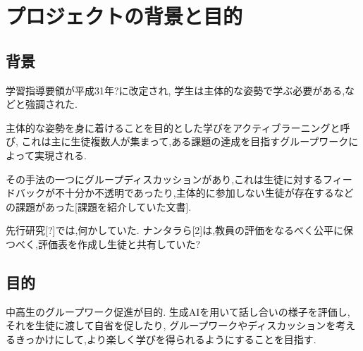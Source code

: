 \chapter{プロジェクトの背景と目的}

\section{背景}
学習指導要領が平成31年?に改定され,
学生は主体的な姿勢で学ぶ必要がある,などと強調された.

主体的な姿勢を身に着けることを目的とした学びをアクティブラーニングと呼び,
これは主に生徒複数人が集まって,ある課題の達成を目指すグループワークによって実現される.

その手法の一つにグループディスカッションがあり,これは生徒に対するフィードバックが不十分か不透明であったり,主体的に参加しない生徒が存在するなどの課題があった[課題を紹介していた文書].

先行研究[?]では,何かしていた.
ナンタラら[2]は,教員の評価をなるべく公平に保つべく,評価表を作成し生徒と共有していた?


\section{目的}
中高生のグループワーク促進が目的.
生成AIを用いて話し合いの様子を評価し,
それを生徒に渡して自省を促したり,
グループワークやディスカッションを考えるきっかけにして,より楽しく学びを得られるようにすることを目指す.
